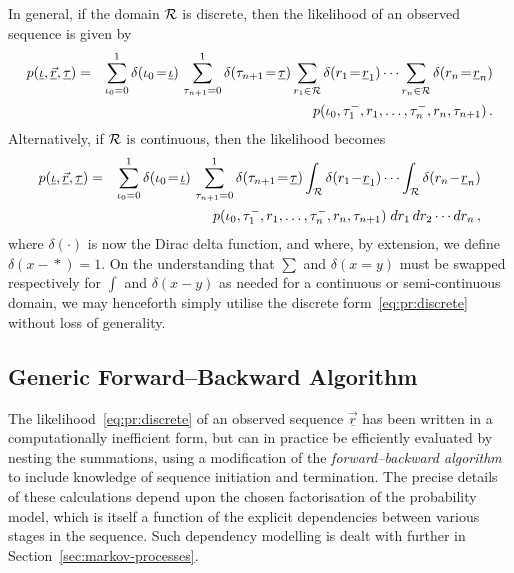 \documentclass[a4paper]{article}
\newcommand{\ui}{\underline{\iota}}
\newcommand{\ut}{\underline{\tau}}
\newcommand{\ur}{\underline{r}}
\newcommand{\vr}{\vec{r}}
\newcommand{\uvr}{\underline{\vr}}
\newcommand{\tm}{\tau^{-}}
\begin{document}
In general, if the domain ${\cal R}$  is discrete, then the likelihood of an observed sequence is given by
\begin{eqnarray}
p(\ui,\uvr,\ut) 
& = & 
\sum_{\iota_0=0}^{1}\delta(\iota_0\!=\!\ui)
\,\sum_{\tau_{n+1}=0}^{1}\delta(\tau_{n+1}\!=\!\ut)
\sum_{r_1\in{\cal R}} \delta(r_1\!=\!\ur_1)
\cdots\sum_{r_n\in{\cal R}} \delta(r_n\!=\!\ur_n)
\nonumber\\
&& \hspace*{5mm}
p(\iota_0,\tm_1,r_1,\ldots,\tm_n,r_n,\tau_{n+1})\,.
\label{eq:pr:discrete}
\end{eqnarray}
Alternatively, if ${\cal R}$ is continuous, then the likelihood becomes
\begin{eqnarray}
p(\ui,\uvr,\ut) 
& = & 
\sum_{\iota_0=0}^{1}\delta(\iota_0\!=\!\ui)
\,\sum_{\tau_{n+1}=0}^{1}\delta(\tau_{n+1}\!=\!\ut)
\int_{{\cal R}} \delta(r_1\!-\!\ur_1)
\cdots\int_{{\cal R}} \delta(r_n\!-\!\ur_n)
\nonumber\\
&& \hspace*{5mm}
p(\iota_0,\tm_1,r_1,\ldots,\tm_n,r_n,\tau_{n+1})
\;dr_1\,dr_2\cdots dr_n
\,,
\end{eqnarray}
where $\delta(\cdot)$ is now the Dirac delta function, and where, by extension, we define $\delta(x\!-\!*)=1$.
On the understanding that $\sum$ and $\delta(x\!=\!y)$ must be swapped respectively for $\int$ and $\delta(x\!-\!y)$ as needed for a continuous 
or semi-continuous domain, we may henceforth simply utilise the discrete form~\eqref{eq:pr:discrete} without loss of generality.

\subsection{Generic Forward--Backward Algorithm}
\label{sec:forward-backward-basic}

The likelihood~\eqref{eq:pr:discrete} of an observed sequence $\uvr$ has been written in a computationally inefficient form,
but can in practice be efficiently evaluated by nesting the summations, using a modification of the {\em forward--backward algorithm} to include knowledge of
sequence initiation and termination.
The precise details of these calculations depend upon the chosen factorisation of the probability model, which is itself a function of
the explicit dependencies between various stages in the sequence. Such dependency modelling is dealt with further in Section~\ref{sec:markov-processes}.
\end{document}
